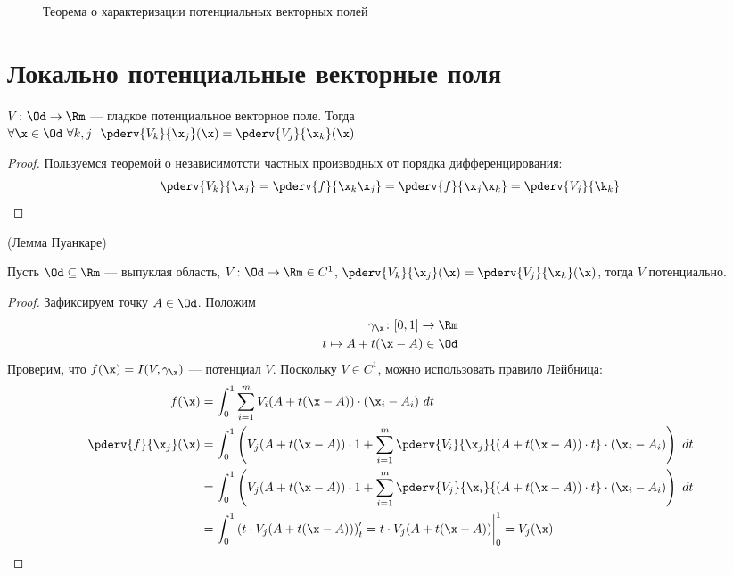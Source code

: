 \newpage

\begin{figure}[ht]
    \centering
    \caption{Теорема о характеризации потенциальных векторных полей}
\end{figure}

\section{Локально потенциальные векторные поля}

\begin{lemma}
    $V \colon \Od \to \Rm$ --- гладкое потенциальное векторное поле. Тогда \\
    $\forall \x \in \Od~ \forall k, j~~
    \pderv{V_k}{\x_j}(\x) = \pderv{V_j}{\x_k}(\x)$
\end{lemma}
\begin{proof}
    Пользуемся теоремой о независимотсти частных производных от порядка дифференцирования:
\[
    \pderv{V_k}{\x_j} = \pderv{f}{\x_k \x_j} = \pderv{f}{\x_j \x_k} =
    \pderv{V_j}{\k_k}
\]
\end{proof}

\begin{theorem}(Лемма Пуанкаре)

    Пусть $\Od \subseteq \Rm$ --- выпуклая область, $V \colon \Od \to \Rm \in C^1$,
    $\pderv{V_k}{\x_j}(\x) = \pderv{V_j}{\x_k}(\x)$, тогда $V$ потенциально.
\end{theorem}
\begin{proof}
     Зафиксируем точку $A \in \Od$. Положим
\begin{align*}
    \gamma_\x \colon [0, 1] \to \Rm \\
    t \mapsto A + t(\x - A) \in \Od
\end{align*}
    Проверим, что $f(\x) = I(V, \gamma_\x)$ --- потенциал $V$. Поскольку
    $V \in C^1$, можно использовать правило Лейбница:
\begin{align*}
    f(\x) &= \int_0^1{\sum_{i = 1}^{m}{V_i(A + t(\x - A)) \cdot (\x_i - A_i) ~dt}} \\
    \pderv{f}{\x_j}(\x) &= \int_0^1{\left(V_j(A + t(\x - A)) \cdot 1 + \sum_{i = 1}^{m}
    {\pderv{V_i}{\x_j}{(A + t(\x - A)) \cdot t} \cdot (\x_i - A_i)}\right)~dt} \\
    &= \int_0^1{\left(V_j(A + t(\x - A)) \cdot 1 + \sum_{i = 1}^{m}
    {\pderv{V_j}{\x_i}{(A + t(\x - A)) \cdot t} \cdot (\x_i - A_i)}\right)~dt} \\
    &= \int_0^1{\left( t \cdot V_j(A + t(\x - A)) \right)'_t}
    = t \cdot V_j(A + t(\x - A))\bigg|_0^1 = V_j(\x)
\end{align*}
\end{proof}

